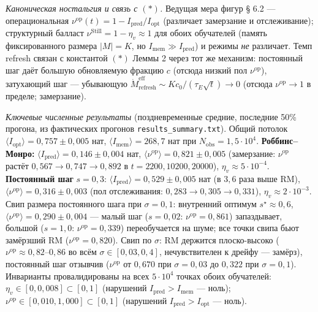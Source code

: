 \documentclass[pdflatex,sn-mathphys-ay]{sn-jnl}
\begin{document}
\emph{Каноническая ностальгия и связь с \((*)\).} Ведущая мера фигур § 6.2 --- операциональная \(\nu^{\text{op}}(t) = 1 - I_{\text{pred}}/I_{\text{opt}}\) (различает замерзание и отслеживание); структурный балласт \(\nu^{\text{Still}} = 1 - \eta_v \approx 1\) для обоих обучателей (память фиксированного размера \(|M| = K\), но \(I_{\text{mem}} \gg I_{\text{pred}}\)) и режимы \emph{не} различает. Темп refresh связан с константой \((*)\) Леммы 2 через тот же механизм: постоянный шаг даёт большую обновляемую фракцию \(c\) (отсюда низкий пол \(\nu^{\text{op}}\)), затухающий шаг --- убывающую \(\dot M_{\text{refresh}}^{\text{eff}} \sim K c_0/(\tau_E\sqrt t) \to 0\) (отсюда \(\nu^{\text{op}} \to 1\) в пределе; замерзание).



\emph{Ключевые численные результаты} (поздневременные средние, последние 50\% прогона, из фактических прогонов \texttt{results\_summary.txt}). Общий потолок \(\langle I_{\text{opt}}\rangle = 0{,}757 \pm 0{,}005\) нат, \(\langle I_{\text{mem}}\rangle = 268{,}7\) нат при \(N_{\text{obs}} = 1{,}5 \cdot 10^4\). \textbf{Роббинс--Монро:} \(\langle I_{\text{pred}}\rangle = 0{,}146 \pm 0{,}004\) нат, \(\langle\nu^{\text{op}}\rangle = 0{,}821 \pm 0{,}005\) (замерзание: \(\nu^{\text{op}}\) растёт \(0{,}567 \to 0{,}747 \to 0{,}892\) в \(t = 2200, 10200, 20000\)), \(\eta_v \approx 5 \cdot 10^{-4}\). \textbf{Постоянный шаг} \(s = 0{,}3\): \(\langle I_{\text{pred}}\rangle = 0{,}529 \pm 0{,}005\) нат (в \(3{,}6\) раза выше RM), \(\langle\nu^{\text{op}}\rangle = 0{,}316 \pm 0{,}003\) (пол отслеживания: \(0{,}283 \to 0{,}305 \to 0{,}331\)), \(\eta_v \approx 2 \cdot 10^{-3}\). Свип размера постоянного шага при \(\sigma = 0{,}1\): внутренний оптимум \(s^\star \approx 0{,}6\), \(\langle\nu^{\text{op}}\rangle = 0{,}290 \pm 0{,}004\) --- малый шаг (\(s = 0{,}02\): \(\nu^{\text{op}} = 0{,}861\)) запаздывает, большой (\(s = 1{,}0\): \(\nu^{\text{op}} = 0{,}339\)) переобучается на шуме; все точки свипа бьют замёрзший RM (\(\nu^{\text{op}} = 0{,}820\)). Свип по \(\sigma\): RM держится плоско-высоко (\(\nu^{\text{op}} \approx 0{,}82\)--\(0{,}86\) во всём \(\sigma \in [0{,}03, 0{,}4]\), нечувствителен к дрейфу --- замёрз), постоянный шаг отзывчив (\(\nu^{\text{op}}\) от \(0{,}670\) при \(\sigma = 0{,}03\) до \(0{,}322\) при \(\sigma = 0{,}1\)). Инварианты провалидированы на всех \(5 \cdot 10^4\) точках обоих обучателей: \(\eta_v \in [0, 0{,}008] \subset [0,1]\) (нарушений \(I_{\text{pred}} > I_{\text{mem}}\) --- ноль); \(\nu^{\text{op}} \in [0{,}010, 1{,}000] \subset [0,1]\) (нарушений \(I_{\text{pred}} > I_{\text{opt}}\) --- ноль).
\end{document}
